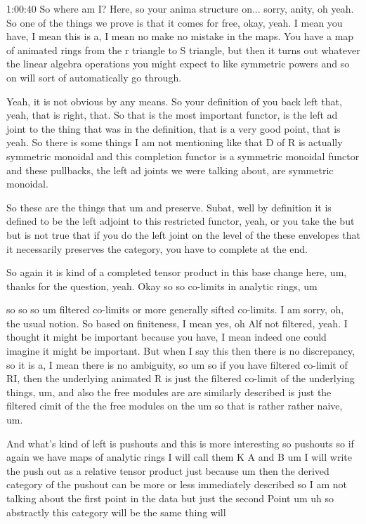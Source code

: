 \begin{unfinished}{1:00:40}
So where am I? Here, so your anima structure on... sorry, anity, oh yeah. So one of the things we prove is that it comes for free, okay, yeah. I mean you have, I mean this is a, I mean no make no mistake in the maps. You have a map of animated rings from the r triangle to S triangle, but then it turns out whatever the linear algebra operations you might expect to like symmetric powers and so on will sort of automatically go through. 

Yeah, it is not obvious by any means. So your definition of you back left that, yeah, that is  right, that. So that is  the most important functor, is the left ad joint to the thing that was in the definition, that is  a very good point, that is  yeah. So there is some things I am not mentioning like that D of R is actually symmetric monoidal and this completion functor is a symmetric monoidal functor and these pullbacks, the left ad joints we were talking about, are symmetric monoidal. 

So these are the things that um and preserve. Subat, well by definition it is defined to be the left adjoint to this restricted functor, yeah, or you take the but but is not true that if you do the left joint on the level of the these envelopes that it necessarily preserves the category, you have to complete at the end. 

So again it is kind of a completed tensor product in this base change here, um, thanks for the question, yeah. Okay so so co-limits in analytic rings, um

 so so so um filtered co-limits or more generally sifted co-limits. I am sorry, oh, the usual notion. So based on finiteness, I mean yes, oh Alf not filtered, yeah. I thought it might be important because you have, I mean indeed one could imagine it might be important. But when I say this then there is no discrepancy, so it is a, I mean there is no ambiguity, so um so if you have filtered co-limit of RI, then the underlying animated R is just the filtered co-limit of the underlying things, um, and also the free modules are are similarly described is just the filtered cimit of the the free modules on the um so that is  rather rather naive, um. 

And what's kind of left is pushouts and this is more interesting so pushouts so if again we have maps of analytic rings I will call them K A and B um I will write the push out as a relative tensor product just because um then the derived category of the pushout can be more or less immediately described so I am not talking about the first point in the data but just the second Point um uh so abstractly this category will be the same thing will


\end{unfinished}

